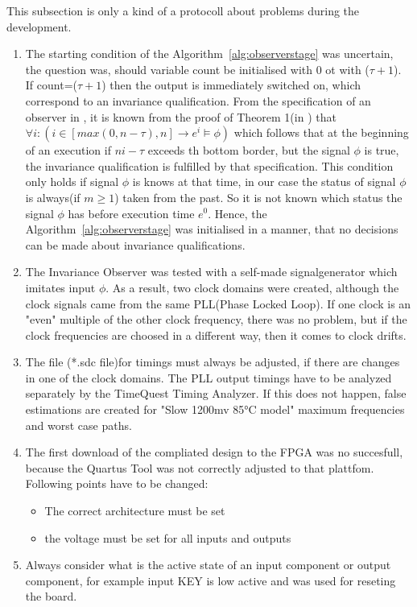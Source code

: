 This subsection is only a kind of a protocoll about problems during the development. 
\begin{enumerate}
\item The starting condition of the Algorithm~\ref{alg:observerstage} was uncertain, the question was, should variable
count be initialised with 0 ot with ($\tau + 1$). If count=($\tau + 1$) then the output is immediately switched on, which
correspond to an invariance qualification. From the specification of an observer in \cite{RTFMBJ13}, it is known from
the proof of Theorem 1(in \cite{RTFMBJ13}) that $\forall i:(i \in [max(0,n-\tau),n] \rightarrow e^i \models \phi)$ which follows 
that at the beginning of an execution if $ni-\tau$ exceeds th bottom border, but the signal $\phi$ is true, the invariance qualification
is fulfilled by that specification. 
This condition only holds if signal $\phi$ is knows at that time, in our case the status of signal $\phi$ is always(if $m \ge 1$) taken from the past. 
So it is not known which status the signal $\phi$ has before execution time $e^0$. Hence, the Algorithm~\ref{alg:observerstage} was initialised in a manner, that
no decisions can be made about invariance qualifications. 
\item The Invariance Observer was tested with a  self-made signalgenerator which imitates input $\phi$. As a result, two clock domains were created, although the clock signals
came from the same PLL(Phase Locked Loop). If one clock is an "even" multiple of the other clock frequency, there was no problem, but if the clock frequencies are choosed in a different way, then
it comes to clock drifts. 
\item The file (*.sdc file)for timings must always be adjusted, if there are changes in one of the clock domains. The PLL output timings have to be analyzed separately by the
TimeQuest Timing Analyzer. If this does not happen, false estimations are created for "Slow 1200mv 85°C model" maximum frequencies and worst case paths. 
\item The first download of the compliated design to the FPGA was no succesfull, because the Quartus Tool was not correctly adjusted to that plattfom. 
Following points have to be changed:
\begin{itemize}
\item The correct architecture must be set
\item the voltage must be set for all inputs and outputs
\end{itemize}
\item Always consider what is the active state of an input component or output component, for example
input KEY is low active and was used for reseting the board. 
\end{enumerate}
